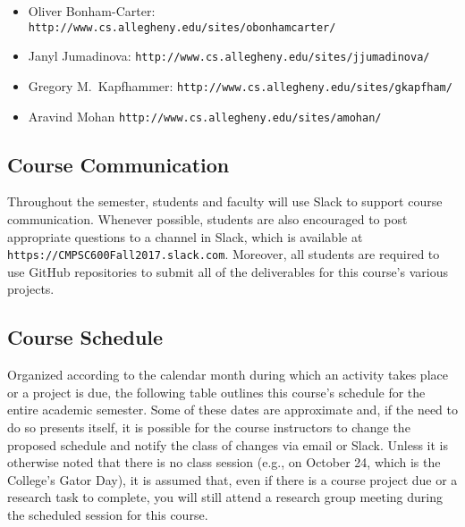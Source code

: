 \documentclass[11pt]{article}
\newcommand{\url}[1]{\lstinline{#1}}
\begin{document}
\vspace*{-.1in}
\begin{itemize}
  \itemsep -.25em
  \item Oliver Bonham-Carter: \url{http://www.cs.allegheny.edu/sites/obonhamcarter/}
  \item Janyl Jumadinova: \url{http://www.cs.allegheny.edu/sites/jjumadinova/}
  \item Gregory M.\ Kapfhammer: \url{http://www.cs.allegheny.edu/sites/gkapfham/}
  \item Aravind Mohan \url{http://www.cs.allegheny.edu/sites/amohan/}
\end{itemize}

\vspace*{-.25in}
\subsection*{Course Communication}

Throughout the semester, students and faculty will use Slack to support course
communication. Whenever possible, students are also encouraged to post
appropriate questions to a channel in Slack, which is available at
\url{https://CMPSC600Fall2017.slack.com}. Moreover, all students are required
to use GitHub repositories to submit all of the deliverables for this course's
various projects.

\vspace*{-.1in}
\subsection*{Course Schedule}

Organized according to the calendar month during which an activity takes place
or a project is due, the following table outlines this course's schedule for the
entire academic semester. Some of these dates are approximate and, if the need
to do so presents itself, it is possible for the course instructors to change
the proposed schedule and notify the class of changes via email or Slack. Unless
it is otherwise noted that there is no class session (e.g., on October 24, which
is the College's Gator Day), it is assumed that, even if there is a course
project due or a research task to complete, you will still attend a research
group meeting during the scheduled session for this course.
\end{document}
